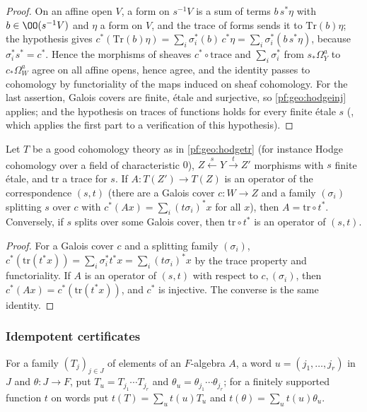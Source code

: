 \begin{proof}
On an affine open $V$, a form on $s^{-1}V$ is a sum of terms $b\,s^*\eta$ with $b\in\OO(s^{-1}V)$ and $\eta$ a form on
$V$, and the trace of forms sends it to $\mathrm{Tr}(b)\eta$; the hypothesis gives
$c^*(\mathrm{Tr}(b)\eta)=\sum_i\sigma_i^*(b)\,c^*\eta=\sum_i\sigma_i^*(b\,s^*\eta)$, because $\sigma_i^*s^*=c^*$. Hence the
morphisms of sheaves $c^*\circ\mathrm{trace}$ and $\sum_i\sigma_i^*$ from $s_*\Omega^a_Y$ to $c_*\Omega^a_W$ agree on all
affine opens, hence agree, and the identity passes to cohomology by functoriality of the maps induced on
sheaf cohomology. For the last assertion, Galois covers are finite, \'etale and surjective, so
\cref{pf:geo:hodgeinj} applies; and the hypothesis on traces of functions holds for every finite \'etale $s$
(, which applies the first part to a verification of this
hypothesis).
\end{proof}

\begin{lemma}\label{pf:geo:optr}
Let $T$ be a good cohomology theory as in \cref{pf:geo:hodgetr} (for instance Hodge cohomology over a field of
characteristic $0$), $Z\xleftarrow{s}Y\xrightarrow{t}Z'$ morphisms with $s$ finite \'etale, and $\mathrm{tr}$ a trace for $s$.
If $A\colon T(Z')\to T(Z)$ is an operator of the correspondence $(s,t)$ (there are a Galois cover $c\colon W\to Z$
and a family $(\sigma_i)$ splitting $s$ over $c$ with $c^*(Ax)=\sum_i(t\sigma_i)^*x$ for all $x$), then
$A=\mathrm{tr}\circ t^*$. Conversely, if $s$ splits over some Galois cover, then $\mathrm{tr}\circ t^*$ is an operator
of $(s,t)$.
\end{lemma}

\begin{proof}
For a Galois cover $c$ and a splitting family $(\sigma_i)$,
$c^*(\mathrm{tr}(t^*x))=\sum_i\sigma_i^*t^*x=\sum_i(t\sigma_i)^*x$ by the trace property and functoriality. If $A$ is an
operator of $(s,t)$ with respect to $c,(\sigma_i)$, then $c^*(Ax)=c^*(\mathrm{tr}(t^*x))$, and $c^*$ is injective. The
converse is the same identity.
\end{proof}

\subsubsection{Idempotent certificates}

For a family $(T_j)_{j\in J}$ of elements of an $F$-algebra $A$, a word $u=(j_1,\dots,j_r)$ in $J$ and
$\theta\colon J\to F$, put $T_u=T_{j_1}\cdots T_{j_r}$ and $\theta_u=\theta_{j_1}\cdots\theta_{j_r}$; for a finitely supported
function $t$ on words put $t(T)=\sum_ut(u)T_u$ and $t(\theta)=\sum_ut(u)\theta_u$.

